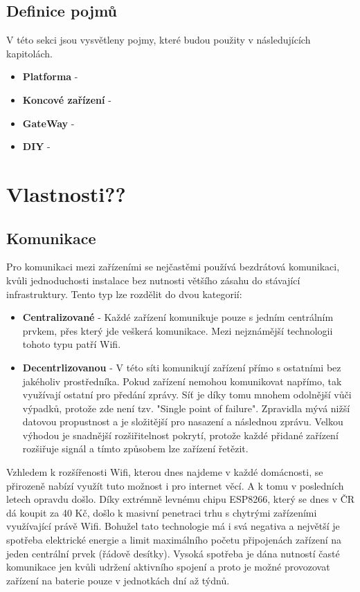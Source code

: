 \documentclass[thesis=B,czech]{FITthesis}[2019/12/23]
\begin{document}
\subsection{Definice pojmů}
V této sekci jsou vysvětleny pojmy, které budou použity v následujících kapitolách.
    
\begin{itemize}
    \item \textbf{Platforma} -
    \item \textbf{Koncové zařízení} -
    \item \textbf{GateWay} -
    \item \textbf{DIY} -
\end{itemize}

\section{Vlastnosti??}

\subsection{Komunikace}    %
    Pro komunikaci mezi zařízeními se nejčastěmi používá bezdrátová komunikaci, kvůli jednoduchosti instalace bez nutnosti většího zásahu do stávající infrastruktury. Tento typ lze rozdělit do dvou kategorií:
    \begin{itemize}
        \item \textbf{Centralizované} - Každé zařízení komunikuje pouze s jedním centrálním prvkem, přes který jde veškerá komunikace. Mezi nejznámější technologii tohoto typu patří Wifi.
        \item \textbf{Decentrlizovanou} - V této síti komunikují zařízení přímo s ostatními bez jakéholiv prostředníka. Pokud zařízení nemohou komunikovat napřímo, tak využívají ostatní pro předání zprávy. Síť je díky tomu mnohem odolnější vůči výpadků, protože zde není tzv. "Single point of failure". Zpravidla mývá nižší datovou propustnost a je složitější pro nasazení a následnou zprávu. Velkou výhodou je snadnější rozšiřitelnost pokrytí, protože každé přidané zařízení rozšiřuje signál a tímto způsobem lze zařízení řetězit.
    \end{itemize}
    Vzhledem k rozšířenosti Wifi, kterou dnes najdeme v každé domácnosti, se přirozeně nabízí využít tuto možnost i pro internet věcí. A k tomu v posledních letech opravdu došlo. Díky extrémně levnému chipu ESP8266, který se dnes v ČR dá koupit za 40 Kč, došlo k masivní penetraci trhu s chytrými zařízeními využívající právě Wifi. Bohužel tato technologie má i svá negativa a největší je spotřeba elektrické energie a limit maximálního početu připojenách zařízení na jeden centrální prvek (řádově desítky). Vysoká spotřeba je dána nutností časté komunikace jen kvůli udržení aktivního spojení a proto je možné provozovat zařízení na baterie pouze v jednotkách dní až týdnů.
\end{document}
